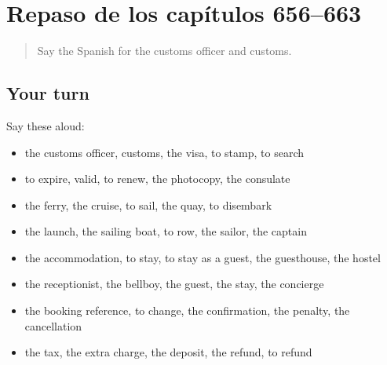 \section[(dialogue)]{Repaso de los capítulos 656–663}

\label{lesson:ES-R663-repaso-656-663}



\begin{quote}
Say the Spanish for the customs officer and customs.
\end{quote}

\subsection*{Your turn}
Say these aloud:

\begin{itemize}
\raggedright
  \item the customs officer, customs, the visa, to stamp, to search
  \item to expire, valid, to renew, the photocopy, the consulate
  \item the ferry, the cruise, to sail, the quay, to disembark
  \item the launch, the sailing boat, to row, the sailor, the captain
  \item the accommodation, to stay, to stay as a guest, the guesthouse, the hostel
  \item the receptionist, the bellboy, the guest, the stay, the concierge
  \item the booking reference, to change, the confirmation, the penalty, the cancellation
  \item the tax, the extra charge, the deposit, the refund, to refund
\end{itemize}

